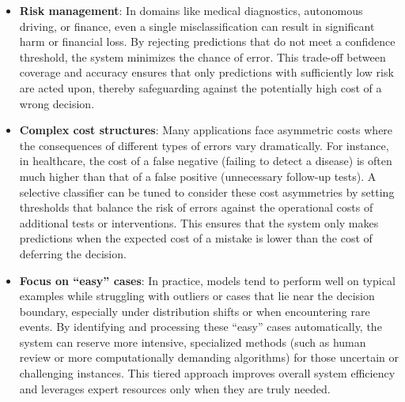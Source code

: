 \begin{itemize}
    \item \textbf{Risk management}: In domains like medical diagnostics, autonomous driving, or finance, even a single misclassification can result in significant harm or financial loss. By rejecting predictions that do not meet a confidence threshold, the system minimizes the chance of error. This trade-off between coverage and accuracy ensures that only predictions with sufficiently low risk are acted upon, thereby safeguarding against the potentially high cost of a wrong decision.

    \item \textbf{Complex cost structures}: Many applications face asymmetric costs where the consequences of different types of errors vary dramatically. For instance, in healthcare, the cost of a false negative (failing to detect a disease) is often much higher than that of a false positive (unnecessary follow-up tests). A selective classifier can be tuned to consider these cost asymmetries by setting thresholds that balance the risk of errors against the operational costs of additional tests or interventions. This ensures that the system only makes predictions when the expected cost of a mistake is lower than the cost of deferring the decision.

    \item \textbf{Focus on ``easy'' cases}: In practice, models tend to perform well on typical examples while struggling with outliers or cases that lie near the decision boundary, especially under distribution shifts or when encountering rare events. By identifying and processing these ``easy'' cases automatically, the system can reserve more intensive, specialized methods (such as human review or more computationally demanding algorithms) for those uncertain or challenging instances. This tiered approach improves overall system efficiency and leverages expert resources only when they are truly needed.
\end{itemize}


